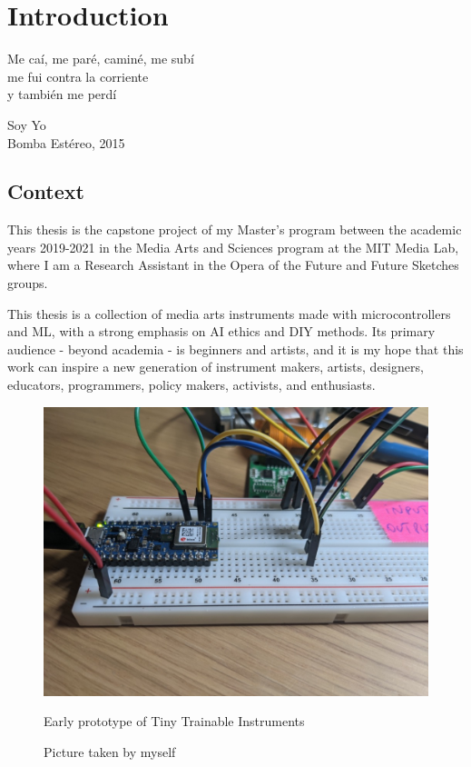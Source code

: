 \chapter{Introduction}

\epigraph{Me caí, me paré, caminé, me subí \\ me fui contra la corriente \\ y también me perdí}{Soy Yo \\ Bomba Estéreo, 2015}

\section{Context}

This thesis is the capstone project of my Master's program between the academic years 2019-2021 in the Media Arts and Sciences program at the MIT Media Lab, where I am a Research Assistant in the Opera of the Future and Future Sketches groups.

This thesis is a collection of media arts instruments made with microcontrollers and \acrfull{ML}, with a strong emphasis on \acrfull{AI} ethics and \acrfull{DIY} methods. Its primary audience - beyond academia - is beginners and artists, and it is my hope that this work can inspire a new generation of instrument makers, artists, designers, educators, programmers, policy makers, activists, and enthusiasts.

\begin{figure}[ht]
  \centering
  \includegraphics[width=0.75\linewidth,height=0.25\textheight,keepaspectratio]{images/tiny-trainable-instruments-early-protoype.jpg}
  \caption{Early prototype of Tiny Trainable Instruments}
  \caption*{Picture taken by myself}
  \label{fig:tiny-trainable-instruments-early-protoype}
\end{figure}

